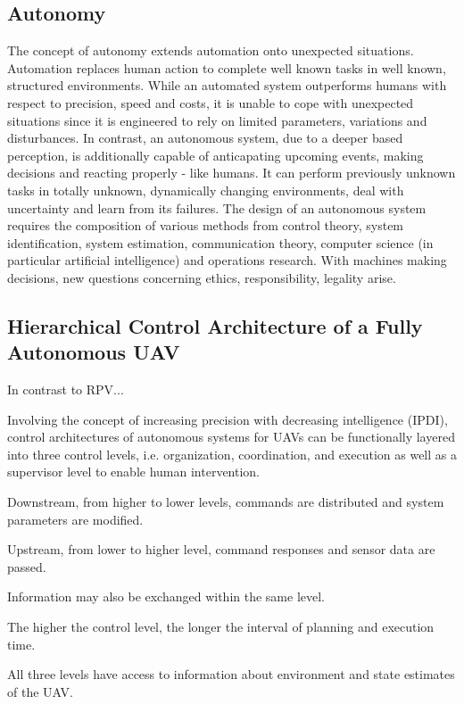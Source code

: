 \subsection{Autonomy}
The concept of autonomy extends
automation 
onto unexpected situations. 
Automation replaces human action
to complete well known tasks in well known, structured environments.
While an automated system outperforms humans
with respect to 
precision, speed and costs,
it is unable to
cope with unexpected situations
since it is engineered to rely on limited
parameters, variations and disturbances.
In contrast,
an autonomous system, 
due to a deeper based perception,
is additionally capable of anticapating upcoming events,
making decisions and reacting properly - like humans.
It can perform previously unknown tasks
in totally unknown, dynamically changing environments,
deal with uncertainty and learn from its failures.
The design of an autonomous system
requires the composition of
various methods from 
control theory,
system identification, 
system estimation,
communication theory,
computer science (in particular artificial intelligence)
and
operations research.
With machines making decisions,
new questions concerning
ethics,
responsibility,
legality
arise.


\subsection{Hierarchical Control Architecture of a Fully Autonomous UAV}

In contrast to RPV...

Involving the concept of 
increasing precision with decreasing intelligence (IPDI),
control architectures of autonomous systems for UAVs 
can be functionally layered
into three control levels, i.e.
organization, coordination, and execution
as well as a supervisor level
to enable human intervention.

Downstream, from higher to lower levels,
commands are distributed and
system parameters are modified.

Upstream, from lower to higher level,
command responses and sensor data
are passed.

Information may also be exchanged within the same level.

The higher the control level,
the longer the interval of planning and execution time.



All three levels have access to
information about 
environment and state estimates of the UAV.

